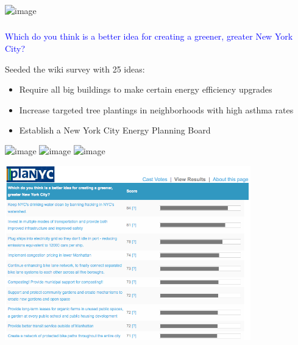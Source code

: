 \documentclass[aspectratio=169]{beamer}
\begin{document}
\begin{frame}
\frametitle{}

\begin{center}
\includegraphics<1>[width=0.95\textwidth]{figures/planyc_greener_greater}
\end{center}

\end{frame}
\begin{frame}
\frametitle{}

\begin{center}
\textcolor{blue}{\large{Which do you think is a better idea for creating a greener, greater New York City?}}\\
\end{center}

Seeded the wiki survey with 25 ideas: 
\begin{itemize}
\item Require all big buildings to make certain energy efficiency upgrades
\item Increase targeted tree plantings in neighborhoods with high asthma rates
\item Establish a New York City Energy Planning Board
\end{itemize}

\end{frame}
\begin{frame}

\begin{center}
\includegraphics<1>[width=0.9\textwidth]{figures/planyc_vote1}
\includegraphics<2>[width=0.9\textwidth]{figures/planyc_vote2}
\includegraphics<3>[width=0.9\textwidth]{figures/planyc_vote3}
\end{center}

\end{frame}
\begin{frame}

\begin{center}
\includegraphics[width=0.8\textwidth]{figures/planyc_results}
\end{center}

\end{frame}
\end{document}

